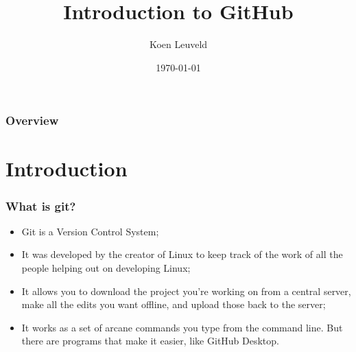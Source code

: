 \documentclass{beamer}
\title[Git]{Introduction to GitHub} %
\author{Koen Leuveld} %
\institute[EDI] %
{
EDI \\ %
\medskip
\textit{k.leuveld@surveybe.com} %
}
\date{\today} %
\begin{document}
\begin{frame}
\titlepage %
\end{frame}

\begin{frame}
\frametitle{Overview} %
\tableofcontents %
\end{frame}


\section{Introduction} %


\begin{frame}
\frametitle{What is git?}
	\begin{itemize}
		\item Git is a Version Control System;
		\item It was developed by the creator of Linux to keep track of the work of all the people helping out on developing Linux;
		\item It allows you to download the project you’re working on from a central server, make all the edits you want offline, and upload those back to the server;
		\item It works as a set of arcane commands you type from the command line. But there are programs that make it easier, like GitHub Desktop.
	\end{itemize}
\end{frame}
\end{document}
